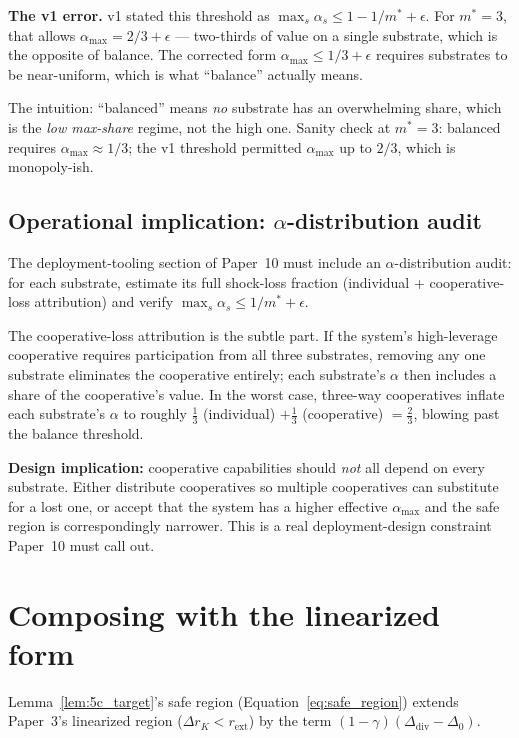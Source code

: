\documentclass{article}
\newcommand{\rext}{r_{\mathrm{ext}}}
\newcommand{\Ddiv}{\Delta_{\mathrm{div}}}
\begin{document}
\textbf{The v1 error.}  v1 stated this threshold as $\max_s \alpha_s
\leq 1 - 1/m^* + \epsilon$.  For $m^* = 3$, that allows
$\alpha_{\max} = 2/3 + \epsilon$ --- two-thirds of value on a single
substrate, which is the opposite of balance.  The corrected form
$\alpha_{\max} \leq 1/3 + \epsilon$ requires substrates to be
near-uniform, which is what ``balance'' actually means.

The intuition: ``balanced'' means \emph{no} substrate has an
overwhelming share, which is the \emph{low max-share} regime, not the
high one.  Sanity check at $m^* = 3$: balanced requires
$\alpha_{\max} \approx 1/3$; the v1 threshold permitted
$\alpha_{\max}$ up to $2/3$, which is monopoly-ish.

\subsection{Operational implication: $\alpha$-distribution audit}

The deployment-tooling section of Paper~10 must include an
$\alpha$-distribution audit: for each substrate, estimate its full
shock-loss fraction (individual + cooperative-loss attribution) and
verify $\max_s \alpha_s \leq 1/m^* + \epsilon$.

The cooperative-loss attribution is the subtle part.  If the system's
high-leverage cooperative requires participation from all three
substrates, removing any one substrate eliminates the cooperative
entirely; each substrate's $\alpha$ then includes a share of the
cooperative's value.  In the worst case, three-way cooperatives
inflate each substrate's $\alpha$ to roughly $\frac{1}{3}$ (individual)
$+\frac{1}{3}$ (cooperative) $= \frac{2}{3}$, blowing past the
balance threshold.

\textbf{Design implication:} cooperative capabilities should
\emph{not} all depend on every substrate.  Either distribute
cooperatives so multiple cooperatives can substitute for a lost one,
or accept that the system has a higher effective $\alpha_{\max}$ and
the safe region is correspondingly narrower.  This is a real
deployment-design constraint Paper~10 must call out.

\section{Composing with the linearized form}

Lemma~\ref{lem:5c_target}'s safe region
(Equation~\ref{eq:safe_region}) extends Paper~3's linearized region
($\Delta r_K < \rext$) by the term $(1-\gamma)(\Ddiv - \Delta_0)$.
\end{document}
